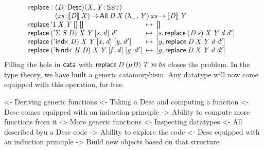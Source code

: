 \[\stk{
\F{replace} : \stk{\PITEL{\V{D}}{\Desc}
                   \PITEL{\V{X},\V{Y}}{\Set}\\
                   \PI{\V{xs}}{\descop{\V{D}}{\V{X}}} 
                   \All{\V{D}}{\V{X}}{(\LAM{\_}\V{Y})}{\V{xs}} \To
                   \descop{\V{D}}{\V{Y}}} \\
\begin{array}{@{}l@{\:\:\mapsto\:\:}l}
\F{replace}\: \DUnit\:          \V{X}\: \V{Y}\: \Void\:          \Void   &
    \Void  \\
\F{replace}\: (\DSigma{\V{S}}{\V{D}})\: \V{X}\: \V{Y}\: \pair{\V{s}}{\V{d}}{}\: \V{d'}  &
    \pair{\V{s}}{\F{replace}\: (\V{D}\: \V{s})\: \V{X}\: \V{Y}\: \V{d}\: \V{d'}}{} \\
\F{replace}\: (\DIndx{\V{D}})\:     \V{X}\: \V{Y}\: \pair{\V{x}}{\V{d}}{}\: \pair{\V{y}}{\V{d'}}{} &
    \pair{\V{y}}{\F{replace}\: \V{D}\: \V{X}\: \V{Y}\: \V{d}\: \V{d'}}{} \\
\F{replace}\: (\DHindx{\V{H}}{\V{D}})\: \V{X}\: \V{Y}\: \pair{\V{f}}{\V{d}}{}\: \pair{\V{g}}{\V{d'}}{} &
 \pair{\V{g}}{\F{replace}\: \V{D}\: \V{X}\: \V{Y}\: \V{d}\: \V{d'}}{}
\end{array}
}\]
%
Filling the hole in $\F{cata}$ with \(\F{replace}\: \V{D}\:
(\Mu{\V{D}})\: \V{T}\: \V{xs}\: \V{hs}\) closes the problem. In the
type theory, we have built a generic catamorphism. Any datatype will
now come equipped with this operation, for free.


\begin{wstructure}
<- Deriving generic functions
    <- Taking a Desc and computing a function
        <- Desc comes equipped with an induction principle
        -> Ability to compute more functions from it
            -> More generic functions
    <- Inspecting datatypes
        <- All described byu a Desc code
        -> Ability to explore the code
            <- Desc equipped with an induction principle
            -> Build new objects based on that structure
\end{wstructure}

